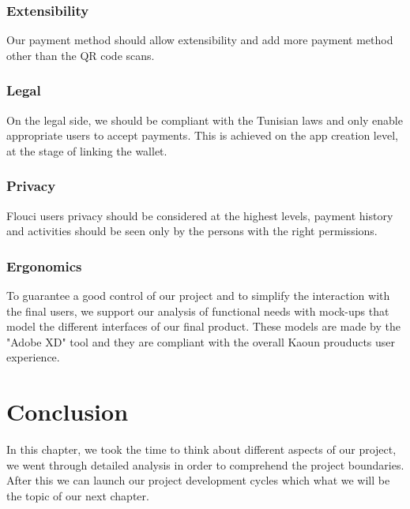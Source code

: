 \begin{spacing}{1.2}
\subsubsection{Extensibility}
Our payment method should allow extensibility and add more payment method other than the QR code scans. 
\subsubsection{Legal}
On the legal side, we should be compliant with the Tunisian laws and only enable appropriate users to accept payments.
This is achieved on the app creation level, at the stage of linking the wallet.
\subsubsection{Privacy}
Flouci users privacy should be considered at the highest levels, payment history and activities should be seen only by the persons with the right permissions.
\subsubsection{Ergonomics}
To guarantee a good control of our project and to simplify the interaction with the final users, we support our analysis of functional needs with mock-ups that model the different interfaces of our final product. These models are made by the "Adobe XD" tool and they are compliant with the overall Kaoun prouducts user experience. 
\section*{Conclusion}
In this chapter, we took the time to think about different aspects of our project, we went through detailed analysis in order to comprehend the project boundaries. After this we can launch our project development cycles which what we will be the topic of our next chapter.
\end{spacing}
